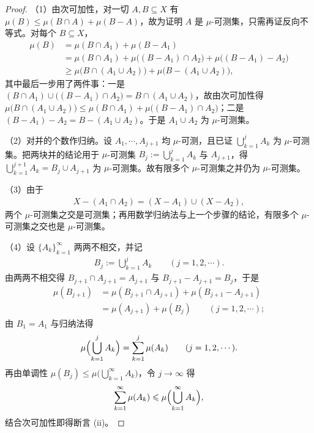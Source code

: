 \documentclass[../../main.tex]{subfiles}
\begin{document}
\begin{proof}
（1）由次可加性，对一切 $A,B\subseteq X$ 有 $\mu(B)\leqslant\mu(B\cap A)+\mu(B-A)$，故为证明 $A$ 是 $\mu$-可测集，只需再证反向不等式。对每个 $B\subseteq X$，
\begin{align*}
\mu(B)&=\mu(B\cap A_{1})+\mu(B-A_{1})\\
&=\mu(B\cap A_{1})+\mu\bigl((B-A_{1})\cap A_{2}\bigr)+\mu\bigl((B-A_{1})-A_{2}\bigr)\\
&\geqslant\mu\bigl(B\cap(A_{1}\cup A_{2})\bigr)+\mu\bigl(B-(A_{1}\cup A_{2})\bigr),
\end{align*}
其中最后一步用了两件事：一是 $(B\cap A_{1})\cup\bigl((B-A_{1})\cap A_{2}\bigr)=B\cap(A_{1}\cup A_{2})$，故由次可加性得 $\mu\bigl(B\cap(A_{1}\cup A_{2})\bigr)\leqslant\mu(B\cap A_{1})+\mu\bigl((B-A_{1})\cap A_{2}\bigr)$；二是 $(B-A_{1})-A_{2}=B-(A_{1}\cup A_{2})$。于是 $A_{1}\cup A_{2}$ 为 $\mu$-可测集。

（2）对并的个数作归纳。设 $A_{1},\cdots,A_{j+1}$ 均 $\mu$-可测，且已证 $\bigcup_{k=1}^{j}A_{k}$ 为 $\mu$-可测集。把两块并的结论用于 $\mu$-可测集 $B_{j}:=\bigcup_{k=1}^{j}A_{k}$ 与 $A_{j+1}$，得 $\bigcup_{k=1}^{j+1}A_{k}=B_{j}\cup A_{j+1}$ 为 $\mu$-可测集。故有限多个 $\mu$-可测集之并仍为 $\mu$-可测集。

（3）由于
\begin{align*}
X-(A_{1}\cap A_{2})=(X-A_{1})\cup(X-A_{2}),
\end{align*}
两个 $\mu$-可测集之交是可测集；再用数学归纳法与上一个步骤的结论，有限多个 $\mu$-可测集之交也是 $\mu$-可测集。

（4）设 $\{A_{k}\}_{k=1}^{\infty}$ 两两不相交，并记
\begin{align*}
B_{j}:=\bigcup_{k=1}^{j}A_{k}\qquad(j=1,2,\cdots).
\end{align*}
由两两不相交得 $B_{j+1}\cap A_{j+1}=A_{j+1}$ 与 $B_{j+1}-A_{j+1}=B_{j}$，于是
\begin{align*}
\mu(B_{j+1})&=\mu(B_{j+1}\cap A_{j+1})+\mu(B_{j+1}-A_{j+1})\\
&=\mu(A_{j+1})+\mu(B_{j})\qquad(j=1,2,\cdots);
\end{align*}
由 $B_{1}=A_{1}$ 与归纳法得
\begin{align*}
\mu\Bigl(\bigcup_{k=1}^{j}A_{k}\Bigr)=\sum_{k=1}^{j}\mu(A_{k})\qquad(j=1,2,\cdots).
\end{align*}
再由单调性 $\mu(B_{j})\leqslant\mu\bigl(\bigcup_{k=1}^{\infty}A_{k}\bigr)$，令 $j\to\infty$ 得
\begin{align*}
\sum_{k=1}^{\infty}\mu(A_{k})\leqslant\mu\Bigl(\bigcup_{k=1}^{\infty}A_{k}\Bigr),
\end{align*}
结合次可加性即得断言 (ii)。


\end{proof}
\end{document}
